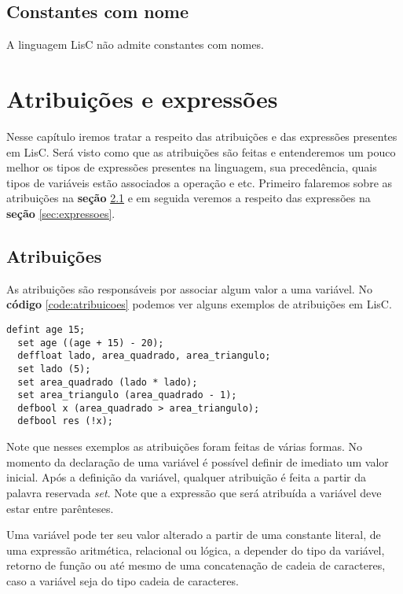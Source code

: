 \documentclass[
  12pt,				%
  oneside,			%
  a4paper,			%
  english,			%
  french,				%
  spanish,			%
  brazil,				%
]{abntex2}
\begin{document}
\section{Constantes com nome}
\label{sec:constantes-com-nome}

A linguagem LisC não admite constantes com nomes.

\chapter{Atribuições e expressões}
\label{cha:atribuicoes-e-expressoes}

Nesse capítulo iremos tratar a respeito das atribuições e das
expressões presentes em LisC. Será visto como que as atribuições são
feitas e entenderemos um pouco melhor os tipos de expressões presentes
na linguagem, sua precedência, quais tipos de variáveis estão
associados a operação e etc. Primeiro falaremos sobre as atribuições
na \textbf{seção} \ref{sec:atribuicoes} e em seguida veremos a respeito das
expressões na \textbf{seção} \ref{sec:expressoes}.

\section{Atribuições}
\label{sec:atribuicoes}

As atribuições são responsáveis por associar algum valor a uma
variável. No \textbf{código} \ref{code:atribuicoes} podemos ver alguns
exemplos de atribuições em LisC.

\begin{lstlisting}[label=code:atribuicoes,caption=Exemplos de
  atribuições.]
  defint age 15;
  set age ((age + 15) - 20);
  deffloat lado, area_quadrado, area_triangulo;
  set lado (5);
  set area_quadrado (lado * lado);
  set area_triangulo (area_quadrado - 1);
  defbool x (area_quadrado > area_triangulo);
  defbool res (!x);
\end{lstlisting}

Note que nesses exemplos as atribuições foram feitas de várias
formas. No momento da declaração de uma variável é possível definir de
imediato um valor inicial. Após a definição da variável, qualquer
atribuição é feita a partir da palavra reservada \emph{set}. Note que
a expressão que será atribuída a variável deve estar entre parênteses.

Uma variável pode ter seu valor alterado a partir de uma constante
literal, de uma expressão aritmética, relacional ou lógica, a
depender do tipo da variável, retorno de função ou até mesmo de uma
concatenação de cadeia de caracteres, caso a variável seja do tipo
cadeia de caracteres.
\end{document}
